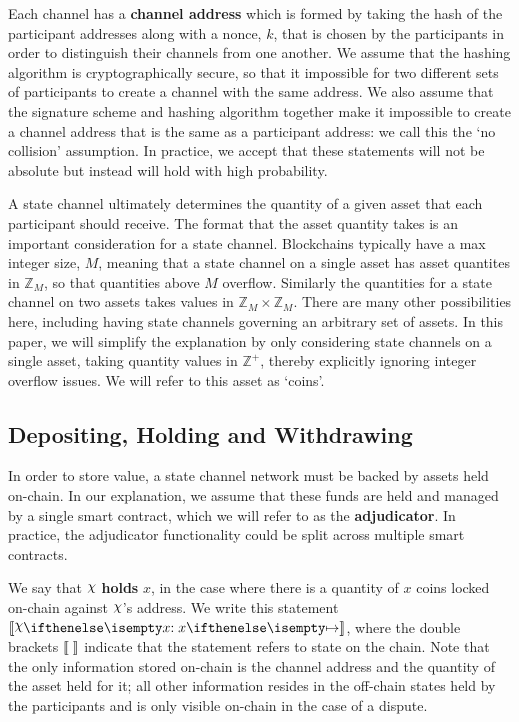 \documentclass{article}
\begin{document}
Each channel has a \textbf{channel address} which is formed by taking the hash of the participant addresses along with a nonce, $k$, that is chosen by the participants in order to distinguish their channels from one another.
We assume that the hashing algorithm is cryptographically secure, so that it impossible for two different sets of participants to create a channel with the same address.
We also assume that the signature scheme and hashing algorithm together make it impossible to create a channel address that is the same as a participant address:
we call this the `no collision' assumption.
In practice, we accept that these statements will not be absolute but instead will hold with high probability.

A state channel ultimately determines the quantity of a given asset that each participant should receive.
The format that the asset quantity takes is an important consideration for a state channel.
Blockchains typically have a max integer size, $M$, meaning that a state channel on a single asset
has asset quantites in $\mathbb{Z}_M$, so that quantities above $M$ overflow.
Similarly the quantities for a state channel on two assets takes values in $\mathbb{Z}_M \times \mathbb{Z}_M$.
There are many other possibilities here, including having state channels governing an arbitrary set of assets.
In this paper, we will simplify the explanation by only considering state channels on a single
asset, taking quantity values in $\mathbb{Z}^+$, thereby explicitly ignoring integer overflow issues.
We will refer to this asset as `coins'.

\subsection{Depositing, Holding and Withdrawing}

In order to store value, a state channel network must be backed by assets held on-chain.
In our explanation, we assume that these funds are held and managed by a single smart contract,
which we will refer to as the \textbf{adjudicator}.
In practice, the adjudicator functionality could be split across multiple smart contracts.

We say that $\rchi$ \textbf{holds} $x$, in the case where there is a quantity of $x$ coins
locked on-chain against $\rchi$'s address.
We write this statement $\adj{\holds{\rchi}{x}{}}$,
where the double brackets $\llbracket \; \rrbracket$ indicate that the statement refers to state on the chain.
Note that the only information stored on-chain is the channel address and the quantity of the asset held for it;
all other information resides in the off-chain states held by the participants and is only visible on-chain in the case of a dispute.
\end{document}
